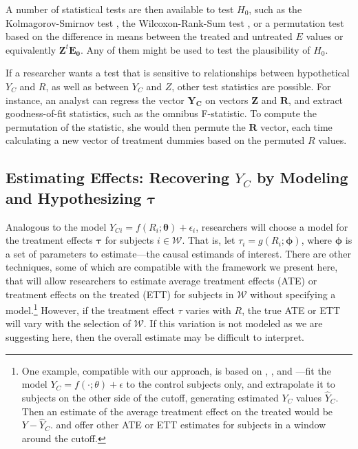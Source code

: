 \documentclass[12pt]{article}
\newcommand{\g}{g}
\newcommand{\ych}{E}
\begin{document}
A number of statistical tests are then available to test $H_0$, such
as the Kolmagorov-Smirnov test \citep{massey1951kolmogorov}, the
Wilcoxon-Rank-Sum test \citep{wilcoxon1970critical}, or a permutation
test based on the difference in means between the treated and
untreated $\ych$ values or equivalently
$\bm{Z}^t\bm{\ych_0}$.
Any of them might be used to test the plausibility of $H_0$.

If a researcher wants a test that is sensitive to relationships between hypothetical $Y_C$ and $R$, as well as between $Y_C$ and $Z$, other test statistics are possible.
For instance, an analyst can regress the vector $\bm{Y_C}$ on vectors $\bm{Z}$ and $\bm{R}$, and extract goodness-of-fit statistics, such as the omnibus F-statistic.
To compute the permutation of the statistic, she would then permute the $\bm{R}$ vector, each time calculating a new vector of treatment dummies based on the permuted $R$ values.

\subsection{Estimating Effects: Recovering $Y_C$ by Modeling and Hypothesizing $\bm{\tau}$}
Analogous to the model $Y_{Ci}=f(R_i;\bm{\theta})+\epsilon_i$,
researchers will choose a model for the treatment effects
$\bm{\tau}$ for subjects $i\in \mathcal{W}$.
That is, let $\tau_i=\g(R_i;\bm{\phi})$, where
$\bm{\phi}$ is a set of parameters to estimate---the causal
estimands of interest.
There are other techniques, some of which are compatible with the
framework we present here, that will allow researchers to estimate
average treatment effects (ATE) or treatment effects on the treated
(ETT) for subjects in $\mathcal{W}$ without specifying a model.\footnote{
One example, compatible with our approach, is based on
\citet{peters:1941}, \citet{belson:1956}, and
\citet{cochran:1969}---fit the model $Y_C=f(\cdot;\theta)+\epsilon$ to the
control subjects only, and extrapolate it to subjects on the other
side of the cutoff, generating estimated $Y_C$ values $\hat{Y}_C$.
Then an estimate of the average treatment effect on the treated would
be $Y-\hat{Y}_C$.
\citet{angrist2012wanna} and \citet{rocio} offer other ATE or ETT
estimates for subjects in a window around the cutoff.}
However, if the treatment effect $\tau$ varies with $R$, the true ATE
or ETT will vary with the selection of $\mathcal{W}$.
If this variation is not modeled as we are suggesting here, then the overall estimate may be
difficult to interpret.
\end{document}
